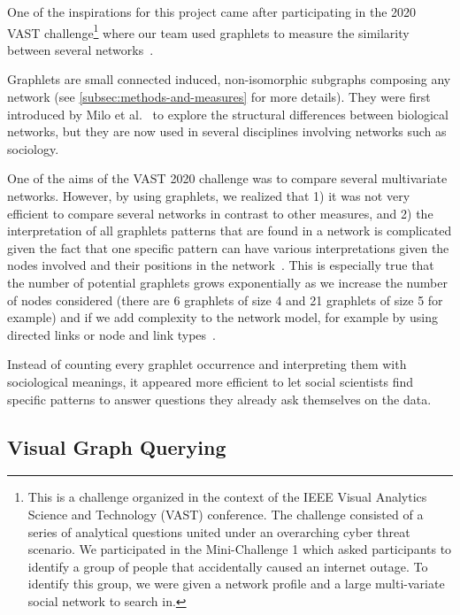 One of the inspirations for this project came after participating in the 2020 VAST challenge\footnote{This is a challenge organized in the context of the IEEE Visual Analytics Science and Technology (VAST) conference. The challenge consisted of a series of analytical questions united under an overarching cyber threat scenario. We participated in the Mini-Challenge 1 which asked participants to identify a group of people that accidentally caused an internet outage. To identify this group, we were given a network profile and a large multi-variate social network to search in.} where our team used graphlets to measure the similarity between several networks~\cite{tovanichVAST2020Contest2021}.

Graphlets are small connected induced, non-isomorphic subgraphs composing any network (see \autoref{subsec:methods-and-measures} for more details).
They were first introduced by Milo et al.~\cite{miloNetworkMotifsSimple2002} to explore the structural differences between biological networks, but they are now used in several disciplines involving networks such as sociology\cite{charbeyStarsHolesPaths2019}.

One of the aims of the VAST 2020 challenge was to compare several multivariate networks.
However, by using graphlets, we realized that 1) it was not very efficient to compare several networks in contrast to other measures, and 2) the interpretation of all graphlets patterns that are found in a network is complicated given the fact that one specific pattern can have various interpretations given the nodes involved and their positions in the network~\cite{ingramNetworkMotifsStructure2006}.
This is especially true that the number of potential graphlets grows exponentially as we increase the number of nodes considered (there are 6 graphlets of size 4 and 21 graphlets of size 5 for example) and if we add complexity to the network model, for example by using directed links or node and link types~\cite{ribeiroDiscoveringColoredNetwork2014}.

Instead of counting every graphlet occurrence and interpreting them with sociological meanings, it appeared more efficient to let social scientists find specific patterns to answer questions they already ask themselves on the data.


\subsection{Visual Graph Querying}



